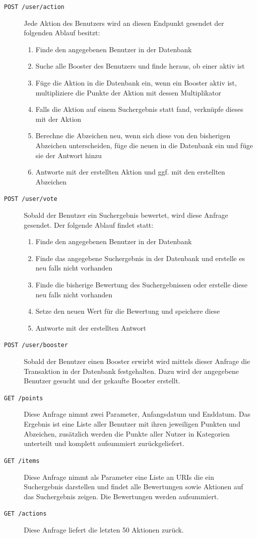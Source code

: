 \documentclass[12pt,twoside]{book}
\begin{document}
\begin{description}
	\item[\texttt{POST  /user/action}] Jede Aktion des Benutzers wird an diesen Endpunkt gesendet der folgenden Ablauf besitzt:
	\begin{enumerate}
		\item Finde den angegebenen Benutzer in der Datenbank
		\item Suche alle Booster des Benutzers und finde heraus, ob einer aktiv ist
		\item Füge die Aktion in die Datenbank ein, wenn ein Booster aktiv ist, multipliziere die Punkte der Aktion mit dessen Multiplikator
		\item Falls die Aktion auf einem Suchergebnis statt fand, verknüpfe dieses mit der Aktion
		\item Berechne die Abzeichen neu, wenn sich diese von den bisherigen Abzeichen unterscheiden, füge die neuen in die Datenbank ein und füge sie der Antwort hinzu
		\item Antworte mit der erstellten Aktion und ggf. mit den erstellten Abzeichen
	\end{enumerate}
	\item[\texttt{POST /user/vote}] Sobald der Benutzer ein Suchergebnis bewertet, wird diese Anfrage gesendet. Der folgende Ablauf findet statt:
	\begin{enumerate}
		\item Finde den angegebenen Benutzer in der Datenbank
		\item Finde das angegebene Suchergebnis in der Datenbank und erstelle es neu falls nicht vorhanden
		\item Finde die bisherige Bewertung des Suchergebnissen oder erstelle diese neu falls nicht vorhanden
		\item Setze den neuen Wert für die Bewertung und speichere diese
		\item Antworte mit der erstellten Antwort
	\end{enumerate}
	\item[\texttt{POST /user/booster}] Sobald der Benutzer einen Booster erwirbt wird mittels dieser Anfrage die Transaktion in der Datenbank festgehalten. Dazu wird der angegebene Benutzer gesucht und der gekaufte Booster erstellt.
	\item[\texttt{GET /points}] Diese Anfrage nimmt zwei Parameter, Anfangsdatum und Enddatum. Das Ergebnis ist eine Liste aller Benutzer mit ihren jeweiligen Punkten und Abzeichen, zusätzlich werden die Punkte aller Nutzer in Kategorien unterteilt und komplett aufsummiert zurückgeliefert.
	\item[\texttt{GET /items}] Diese Anfrage nimmt als Parameter eine Liste an URIs die ein Suchergebnis darstellen und findet alle Bewertungen sowie Aktionen auf das Suchergebnis zeigen. Die Bewertungen werden aufsummiert.
	\item[\texttt{GET /actions}] Diese Anfrage liefert die letzten 50 Aktionen zurück.

\end{description}
\end{document}
